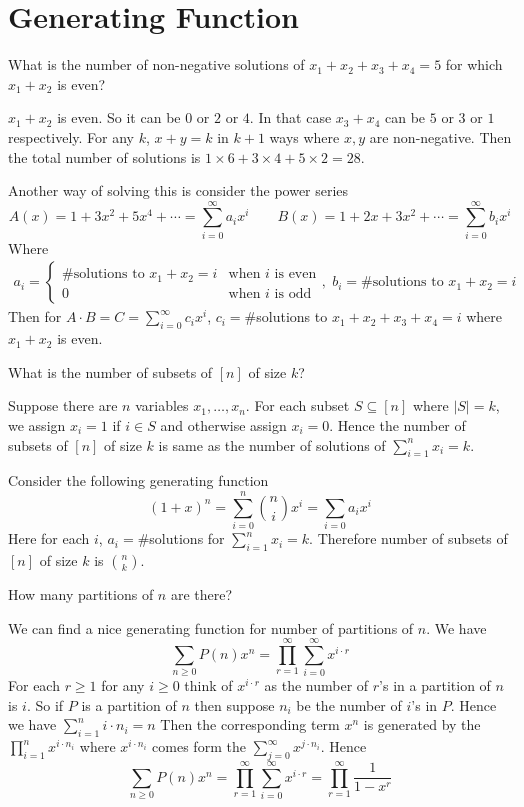 \section{Generating Function}
\begin{Question}{}{}
	What is the number of non-negative solutions of $x_1+x_2+x_3+x_4=5$ for which $x_1+x_2$ is even?
\end{Question}
\begin{solution}
	$x_1+x_2$ is even. So it can be $0$ or $2$ or $4$. In that case $x_3+x_4$ can be $5$ or $3$ or $1$ respectively. For any $k$, $x+y=k$  in $k+1$ ways where $x,y$ are non-negative. Then the total number of solutions is $1\times 6+3\times 4+5\times 2=28$.
	
	Another way of solving this is consider the power series $$A(x)=1+3x^2+5x^4+\cdots=\sum_{i=0}^{\infty}a_ix^i\qquad B(x)=1+2x+3x^2+\cdots=\sum_{i=0}^{\infty}b_ix^i$$Where \begin{align*}
		a_i=\begin{cases}
			\#\text{solutions to $x_1+x_2=i$}& \text{when $i$ is even}\\
			0 & \text{when $i$ is odd}
		\end{cases},  &&  b_i=		\#\text{solutions to $x_1+x_2=i$}
	\end{align*}
Then for $A\cdot B=C=\sum\limits_{i=0}^{\infty}c_ix^i$, $c_i=\#$solutions to $x_1+x_2+x_3+x_4=i$ where $x_1+x_2$ is even.
\end{solution}
\begin{Question}{}{}
	What is the number of subsets of $[n]$ of size $k$?
\end{Question}
\begin{solution}
	Suppose there are $n$ variables $x_1,\dots, x_n$. For each subset $S\subseteq [n]$ where $|S|=k$, we assign $x_i=1$ if $i\in S$ and otherwise assign $x_i=0$. Hence the number of subsets of $[n]$ of size $k$ is same as the number of solutions of $\sum\limits_{i=1}^nx_i=k$. 
	
	Consider the following generating function $$(1+x)^n=\sum_{i=0}^n \binom{n}ix^i=\sum_{i=0}a_ix^i$$Here for each $i$, $a_i=\#$solutions for $\sum\limits_{i=1}^nx_i=k$. Therefore number of subsets of $[n]$ of size $k$ is $\binom{n}k$. 
\end{solution}
\begin{Question}{}{}
	How many partitions of $n$ are there?
\end{Question}
\begin{solution}
	We can find a nice generating function for number of partitions of $n$. We have $$\sum_{n\geq 0}P(n)x^n=\prod_{r=1}^{\infty}\sum_{i=0}^{\infty}x^{i\cdot r}$$For each $r\geq 1$ for any $i\geq 0$ think of $x^{i\cdot r}$ as the number of $r$'s in a partition of $n$ is $i$. So if $P$ is a partition of $n$ then suppose $n_i$ be the number of $i$'s in $P$. Hence we have $\sum\limits_{i=1}^ni\cdot n_i=n$ Then the corresponding term $x^n$ is generated by the $\prod\limits_{i=1}^nx^{i\cdot n_i}$ where $x^{i\cdot n_i}$ comes form the $\sum\limits_{j=0}^{\infty}x^{j\cdot n_i}$. Hence $$\sum_{n\geq 0}P(n)x^n=\prod_{r=1}^{\infty}\sum_{i=0}^{\infty}x^{i\cdot r}=\prod_{r=1}^{\infty}\frac1{1-x^r}$$
\end{solution}
